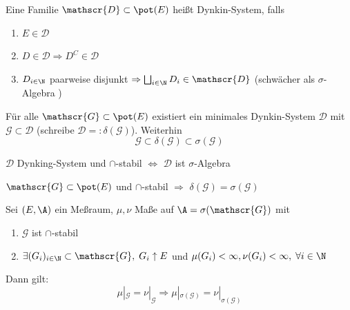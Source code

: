 \documentclass[11pt, a4paper]{article}
\def\SigAlg{$\sigma$-Algebra }
\begin{document}
\begin{definition}\Theorem
    Eine Familie $\mathscr{D}\subset \pot(E)$ heißt Dynkin-System, falls

    \begin{enumerate}
        \item $E\in \mathscr{D}$
        \item $D\in \mathscr{D} \Rightarrow D^C \in \mathscr{D}$
        \item $D_{i\in \N}$ paarweise disjunkt $\Rightarrow \bigsqcup_{i\in \N} D_i \in \mathscr{D}$ (schwächer als \SigAlg)
    \end{enumerate}
\end{definition}

\begin{theorem}
    Für alle $\mathscr{G}\subset \pot(E)$ existiert ein minimales Dynkin-System $\mathscr{D}$ mit $\mathscr{G}\subset \mathscr{D}$ (schreibe $\mathscr{D}=: \delta(\mathscr{G})$). Weiterhin
    $$\mathscr{G}\subset \delta(\mathscr{G}) \subset \sigma(\mathscr{G})$$
\end{theorem}

\begin{lemma}
    $\mathscr{D}$ Dynking-System und $\cap$-stabil $ \Leftrightarrow $ $\mathscr{D}$ ist \SigAlg
\end{lemma}

\begin{lemma}
    $\mathscr{G}\subset \pot(E)$ und $\cap$-stabil $\Rightarrow$ $\delta(\mathscr{G})= \sigma(\mathscr{G})$
\end{lemma}









\begin{theorem} \Theorem
    Sei $(E,\A)$ ein Meßraum, $\mu, \nu$ Maße auf $\A = \sigma(\mathscr{G})$ mit 
    \begin{enumerate}[label = \alph*)]
        \item $\mathscr{G}$ ist $\cap$-stabil
        \item $\exists (G_i)_{i\in \N} \subset \mathscr{G},\; G_i \uparrow E$ und $\mu(G_i) < \infty, \nu(G_i) < \infty, \; \forall i\in \N$
    \end{enumerate}
Dann gilt: 
 $$\mu |_{\mathscr{G}} =\nu |_{\mathscr{G}} \Rightarrow \mu |_{\sigma(\mathscr{G})} =\nu |_{\sigma(\mathscr{G})}$$

\end{theorem}
\end{document}
